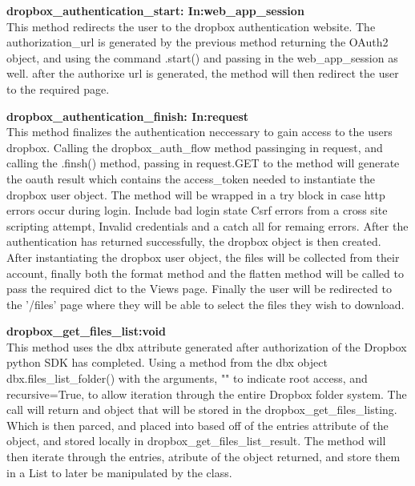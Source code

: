 \textbf{dropbox\_authentication\_start: In:web\_app\_session} \\
    This method redirects the user to the dropbox authentication website. The authorization\_url is generated by the previous method returning 
    the OAuth2 object, and using the command .start() and passing in the web\_app\_session as well. after the authorixe url is generated, the 
    method will then redirect the user to the required page. 

\textbf{dropbox\_authentication\_finish: In:request} \\
    This method finalizes the authentication neccessary to gain access to the users dropbox. Calling the dropbox\_auth\_flow method passinging in
    request, and calling the .finsh() method, passing in request.GET to the method will generate the oauth result which contains the access\_token 
    needed to instantiate the dropbox user object. The method will be wrapped in a try block in case http errors occur during login. Include bad login state
    Csrf errors from a cross site scripting attempt, Invalid credentials and a catch all for remaing errors. After the authentication has returned 
    successfully, the dropbox object is then created. After instantiating the dropbox user object, the files will be collected from their account, 
    finally both the format method and the flatten method will be called to pass the required dict to the Views page. Finally the user will be redirected
    to the '/files' page where they will be able to select the files they wish to download.

\textbf{dropbox\_get\_files\_list:void} \\
    This method uses the dbx attribute generated after authorization of the Dropbox python SDK has completed. Using a method from the dbx object
    dbx.files\_list\_folder() with the arguments, "" to indicate root access, and recursive=True, to allow iteration through the entire Dropbox
    folder system. The call will return and object that will be stored in the dropbox\_get\_files\_listing. Which is then parced, and placed into
    based off of the entries attribute of the object, and stored locally in dropbox\_get\_files\_list\_result. The method will then iterate through
    the entries, atribute of the object returned, and store them in a List to later be manipulated by the class.

